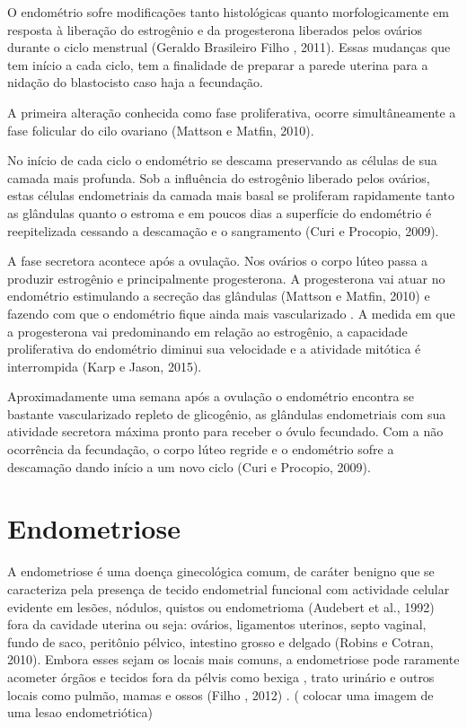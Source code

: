 \documentclass[12pt]{article} %
\begin{document}
O endométrio sofre modificações tanto histológicas quanto morfologicamente em resposta à liberação do estrogênio e da progesterona liberados pelos ovários durante o ciclo menstrual (Geraldo Brasileiro Filho , 2011). Essas mudanças que tem início a cada ciclo, tem a finalidade de preparar a parede uterina para a nidação do blastocisto caso haja a fecundação.

A primeira alteração conhecida como fase proliferativa, ocorre simultâneamente a fase folicular do cilo ovariano (Mattson e Matfin, 2010).

No início de cada ciclo o endométrio  se descama preservando as células de sua camada mais profunda. Sob a influência do estrogênio liberado pelos ovários, estas células endometriais da camada mais basal se proliferam rapidamente tanto as glândulas quanto o estroma e em poucos dias a superfície do endométrio é reepitelizada cessando a descamação e o sangramento (Curi e Procopio, 2009).


A fase secretora acontece após a ovulação. Nos ovários o corpo lúteo passa a produzir estrogênio e principalmente progesterona. A progesterona vai atuar no endométrio estimulando a secreção das glândulas (Mattson e Matfin, 2010) e fazendo com que o endométrio fique ainda mais vascularizado . A medida em que a progesterona vai predominando em relação ao estrogênio, a capacidade proliferativa do endométrio diminui sua velocidade e a atividade mitótica é interrompida (Karp e Jason, 2015).


Aproximadamente uma semana após a ovulação o endométrio encontra se bastante vascularizado repleto de glicogênio, as glândulas endometriais com sua atividade secretora máxima pronto para receber o óvulo fecundado. Com a não ocorrência da fecundação, o corpo lúteo regride e o endométrio sofre a descamação dando início a um novo ciclo (Curi e Procopio, 2009).



\section{Endometriose}
A endometriose é uma doença ginecológica comum, de caráter benigno que se caracteriza pela presença de tecido endometrial funcional com actividade celular evidente em lesões, nódulos, quistos ou endometrioma (Audebert et al., 1992) fora da cavidade uterina ou seja: ovários, ligamentos uterinos, septo vaginal, fundo de saco, peritônio pélvico, intestino grosso e delgado (Robins e Cotran, 2010). Embora esses sejam os locais mais comuns, a endometriose pode raramente acometer órgãos e tecidos  fora da pélvis como bexiga , trato urinário e outros locais como pulmão, mamas e ossos (Filho , 2012) .
( colocar uma imagem de uma lesao endometriótica) 
\end{document}
